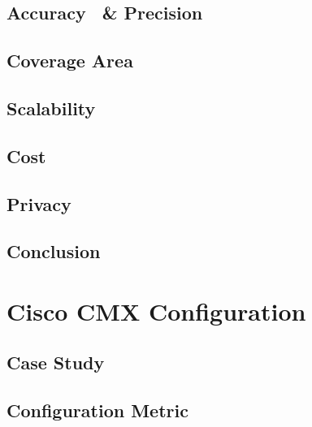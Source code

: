 \subsection{Accuracy ~\& Precision}
\subsection{Coverage Area}
\subsection{Scalability}
\subsection{Cost}
\subsection{Privacy}
\subsection{Conclusion}
\section{Cisco CMX Configuration}
\subsection{Case Study}
\subsection{Configuration Metric}